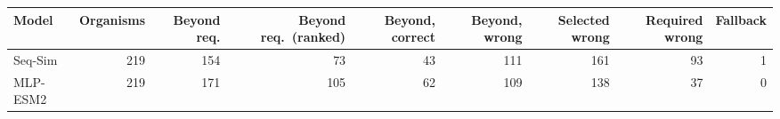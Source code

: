 \begin{tabular}{lrrrrrrrr}
\toprule
Model & Organisms & Beyond req. & Beyond req.\ (ranked) & Beyond, correct & Beyond, wrong & Selected wrong & Required wrong & Fallback \\
\midrule
Seq-Sim & 219 & 154 & 73 & 43 & 111 & 161 & 93 & 1 \\
MLP-ESM2 & 219 & 171 & 105 & 62 & 109 & 138 & 37 & 0 \\
\bottomrule
\end{tabular}
